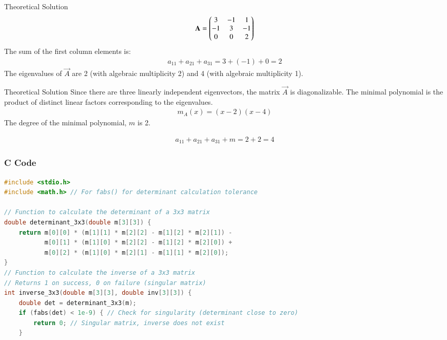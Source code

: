 \documentclass{beamer}
\begin{document}
\begin{frame}{Theoretical Solution}
\begin{align}
\mathbf{A} = \begin{pmatrix}
3 & -1 & 1 \\
-1 & 3 & -1 \\
0 & 0 & 2
\end{pmatrix}
\end{align}
The sum of the first column elements is:
\begin{align}
a_{11} + a_{21} + a_{31} = 3 + (-1) + 0 = 2
\end{align}
The eigenvalues of $\vec{A}$ are 2 (with algebraic multiplicity 2) and 4 (with algebraic multiplicity 1).\\
\end{frame}

\begin{frame}{Theoretical Solution}
Since there are three linearly independent eigenvectors, the matrix $\vec{A}$ is diagonalizable. The minimal polynomial is the product of distinct linear factors corresponding to the eigenvalues.
\begin{align}
m_A(x) = (x-2)(x-4)
\end{align}
The degree of the minimal polynomial, $m$ is 2.

\begin{align}
a_{11} + a_{21} + a_{31} + m = 2 + 2 = 4
\end{align}
\end{frame}

\begin{frame}[fragile]
\frametitle{C Code}
\begin{lstlisting}[language=C]
#include <stdio.h>
#include <math.h> // For fabs() for determinant calculation tolerance

// Function to calculate the determinant of a 3x3 matrix
double determinant_3x3(double m[3][3]) {
    return m[0][0] * (m[1][1] * m[2][2] - m[1][2] * m[2][1]) -
           m[0][1] * (m[1][0] * m[2][2] - m[1][2] * m[2][0]) +
           m[0][2] * (m[1][0] * m[2][1] - m[1][1] * m[2][0]);
}
// Function to calculate the inverse of a 3x3 matrix
// Returns 1 on success, 0 on failure (singular matrix)
int inverse_3x3(double m[3][3], double inv[3][3]) {
    double det = determinant_3x3(m);
    if (fabs(det) < 1e-9) { // Check for singularity (determinant close to zero)
        return 0; // Singular matrix, inverse does not exist
    }
\end{lstlisting}
\end{frame}
\end{document}
